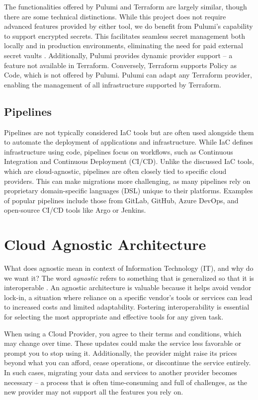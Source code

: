The functionalities offered by Pulumi and Terraform are largely similar, though there are some technical distinctions. While this project does not require advanced features provided by either tool, we do benefit from Pulumi's capability to support encrypted secrets. This facilitates seamless secret management both locally and in production environments, eliminating the need for paid external secret vaults \Parencite{pulumi_vs_terraform}. Additionally, Pulumi provides dynamic provider support -- a feature not available in Terraform. Conversely, Terraform supports Policy as Code, which is not offered by Pulumi. Pulumi can adapt any Terraform provider, enabling the management of all infrastructure supported by Terraform.

\subsection{Pipelines}
Pipelines are not typically considered IaC tools but are often used alongside them to automate the deployment of applications and infrastructure. While IaC defines infrastructure using code, pipelines focus on workflows, such as Continuous Integration and Continuous Deployment (CI/CD). Unlike the discussed IaC tools, which are cloud-agnostic, pipelines are often closely tied to specific cloud providers. This can make migrations more challenging, as many pipelines rely on proprietary domain-specific languages (DSL) unique to their platforms. Examples of popular pipelines include those from GitLab, GitHub, Azure DevOps, and open-source CI/CD tools like Argo or Jenkins.

\section{Cloud Agnostic Architecture}
What does agnostic mean in context of Information Technology (IT), and why do we want it? The word \textit{agnostic} refers to something that is generalized so that it is interoperable \Parencite{techtarget_agnostic_definition}. An agnostic architecture is valuable because it helps avoid vendor lock-in, a situation where reliance on a specific vendor's tools or services can lead to increased costs and limited adaptability. Fostering interoperability is essential for selecting the most appropriate and effective tools for any given task.

When using a Cloud Provider, you agree to their terms and conditions, which may change over time. These updates could make the service less favorable or prompt you to stop using it. Additionally, the provider might raise its prices beyond what you can afford, cease operations, or discontinue the service entirely. In such cases, migrating your data and services to another provider becomes necessary -- a process that is often time-consuming and full of challenges, as the new provider may not support all the features you rely on.

